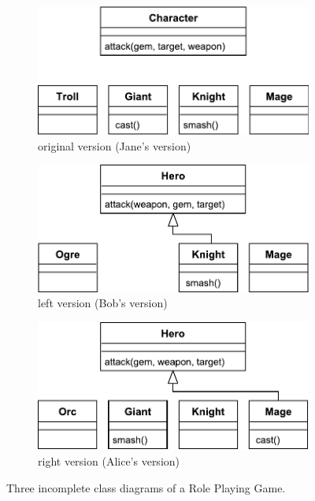 \begin{figure}[]
  \centering
  \begin{subfigure}[t]{0.31\linewidth}
    \includegraphics[width=\linewidth]{class_diagram_origin}
    \caption{original version (Jane's version)}
    \label{fig:class_diagram_origin}
  \end{subfigure}
  \hfill
  \begin{subfigure}[t]{0.31\linewidth}
    \includegraphics[width=\linewidth]{class_diagram_left}
    \caption{left version (Bob's version)}
    \label{fig:class_diagram_left}
  \end{subfigure}
  \hfill
  \begin{subfigure}[t]{0.31\linewidth}
    \includegraphics[width=\linewidth]{class_diagram_right}
    \caption{right version (Alice's version)}
    \label{fig:class_diagram_right}
  \end{subfigure}
  \caption{Three incomplete class diagrams of a Role Playing Game.}
  \label{fig:class_diagram_rpg}
\end{figure}

